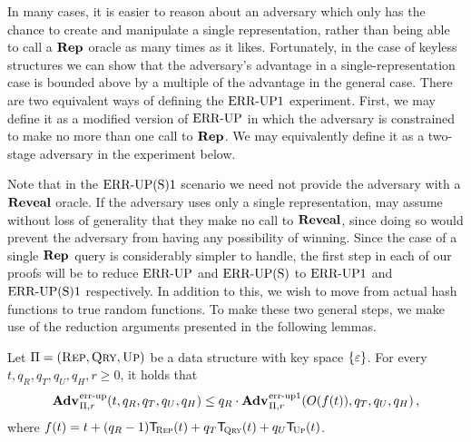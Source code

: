 In many cases, it is easier to reason about an adversary which only has the chance to create and manipulate a single representation, rather than being able to call a $\mathbf{Rep}\hspace{0.5pt}$ oracle as many times as it likes. Fortunately, in the case of keyless structures we can show that the adversary's advantage in a single-representation case is bounded above by a multiple of the advantage in the general case. There are two equivalent ways of defining the $\textnormal{ERR\mbox{-}UP}1$ experiment. First, we may define it as a modified version of $\textnormal{ERR\mbox{-}UP}$ in which the adversary is constrained to make no more than one call to $\mathbf{Rep}\hspace{0.5pt}$. We may equivalently define it as a two-stage adversary in the experiment below.



Note that in the $\textnormal{ERR\mbox{-}UP(S)}1$ scenario we need not provide the adversary with a $\mathbf{Reveal}$ oracle. If the adversary uses only a single representation, may assume without loss of generality that they make no call to $\mathbf{Reveal}$, since doing so would prevent the adversary from having any possibility of winning. Since the case of a single $\mathbf{Rep}\hspace{0.5pt}$ query is considerably simpler to handle, the first step in each of our proofs will be to reduce $\textnormal{ERR\mbox{-}UP}$ and $\textnormal{ERR\mbox{-}UP(S)}$ to $\textnormal{ERR\mbox{-}UP}1$ and $\textnormal{ERR\mbox{-}UP(S)}1$ respectively. In addition to this, we wish to move from actual hash functions to true random functions. To make these two general steps, we make use of the reduction arguments presented in the following lemmas.

\begin{lemma}\label{lemma:errep}
  Let $\mathrm{\Pi} = (\textsc{Rep}, \textsc{Qry}, \textsc{Up})$ be a data structure with key
  space $\{\varepsilon\}$. For every $t, q_R, q_T, q_U, q_H, r\geq 0$, it holds that
  \[
    \Adv{\errep}_{\struct,r}(t, q_R, q_T, q_U, q_H) \leq
    q_R\cdot\Adv{\errep1}_{\struct,r}(O(f(t)), q_T, q_U, q_H) \,,
  \]
  where $f(t) = t + (q_R-1)\ticks(\Rep,t) + q_T\ticks(\Qry,t) + q_U\ticks(\Up,t)$.
\end{lemma}


